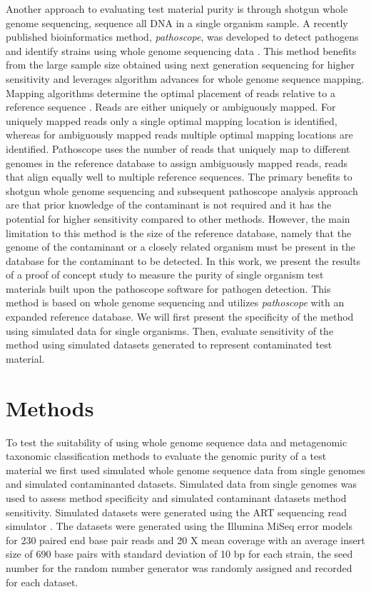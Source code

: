 \documentclass[fleqn,10pt,lineno]{wlpeerj}\usepackage[]{graphicx}\usepackage[]{color}
\begin{document}
Another approach to evaluating test material purity is through shotgun whole genome sequencing, sequence all DNA in a single organism sample. 
A recently published bioinformatics method, \textit{pathoscope}, was developed to detect pathogens and identify strains using whole genome sequencing data \citep{Francis2013}. 
This method benefits from the large sample size obtained using next generation sequencing for higher sensitivity and leverages algorithm advances for whole genome sequence mapping.  Mapping algorithms determine the optimal placement of reads relative to a reference sequence \citep{Schbath2012}. 
Reads are either uniquely or ambiguously mapped.  For uniquely mapped reads only a single optimal mapping location is identified, whereas for ambiguously mapped reads multiple optimal mapping locations are identified. 
Pathoscope uses the number of reads that uniquely map to different genomes in the reference database to assign ambiguously mapped reads, reads that align equally well to multiple reference sequences. 
The primary benefits to shotgun whole genome sequencing and subsequent pathoscope analysis approach are that prior knowledge of the contaminant is not required and it has the potential for higher sensitivity compared to other methods. 
However, the main limitation to this method is the size of the reference database, namely that the genome of the contaminant or a closely related organism must be present in the database for the contaminant to be detected. 
In this work, we present the results of a proof of concept study to measure the purity of single organism test materials built upon the pathoscope software for pathogen detection. 
This method is based on whole genome sequencing and utilizes \textit{pathoscope} with an expanded reference database. 
We will first present the specificity of the method using simulated data for single organisms. 
Then, evaluate sensitivity of the method using simulated datasets generated to represent contaminated test material.  


\section*{Methods}
To test the suitability of using whole genome sequence data and metagenomic taxonomic classification methods to evaluate the genomic purity of a test material we first used simulated whole genome sequence data from single genomes and simulated contaminanted datasets. 
Simulated data from single genomes was used to assess method specificity and simulated contaminant datasets method sensitivity. Simulated datasets were generated using the ART sequencing read simulator \citep{Huang2012}. 
The datasets were generated using the Illumina MiSeq error models for 230 paired end base pair reads and 20 X mean coverage with an average insert size of 690 base pairs with standard deviation of 10 bp for each strain, 
the seed number for the random number generator was randomly assigned and recorded for each dataset. 
\end{document}
